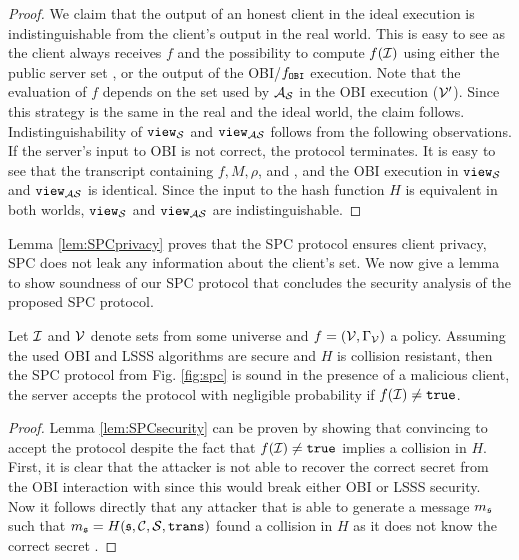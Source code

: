 \begin{proof}
We claim that the output of an honest client in the ideal execution is indistinguishable from the client's output in the real world.
This is easy to see as the client always receives $f$ and the possibility to compute $f(\mathcal{I})$ using either the public server set \ServerSet, or the output of the \ac{OBI}/$f_\mathtt{OBI}$ execution.
Note that the evaluation of $f$ depends on the set used by $\mathcal{A}_\mathcal{S}$ in the \ac{OBI} execution ($\mathcal{V}'$).
Since this strategy is the same in the real and the ideal world, the claim follows.
Indistinguishability of $\mathtt{view}_\mathcal{S}$ and $\mathtt{view}_{\mathcal{A}\mathcal{S}}$ follows from the following observations.
If the server's input to \ac{OBI} is not correct, the protocol terminates.
It is easy to see that the transcript containing $f, M, \rho$, and \ServerSet, and the \ac{OBI} execution in $\mathtt{view}_\mathcal{S}$ and $\mathtt{view}_{\mathcal{A}\mathcal{S}}$ is identical.
Since the input to the hash function $H$ is equivalent in both worlds, $\mathtt{view}_\mathcal{S}$ and $\mathtt{view}_{\mathcal{A}\mathcal{S}}$ are indistinguishable.

\end{proof}

\noindent
Lemma \ref{lem:SPCprivacy} proves that the \ac{SPC} protocol ensures client privacy, \ie \ac{SPC} does not leak any information about the client's set.
We now give a lemma to show soundness of our \ac{SPC} protocol that concludes the security analysis of the proposed \ac{SPC} protocol.

\begin{lemma}[Soundness]\label{lem:SPCsecurity}
  Let $\mathcal{I}$ and $\mathcal{V}$ denote sets from some universe and $f=(\mathcal{V},\Gamma_\mathcal{V})$ a policy.
  Assuming the used \ac{OBI} and \ac{LSSS} algorithms are secure and $H$ is collision resistant, then the \ac{SPC} protocol from Fig. \ref{fig:spc} is sound in the presence of a malicious client, \ie the server accepts the protocol with negligible probability if $f(\mathcal{I})\not=\mathtt{true}$.
\end{lemma}

\begin{proof}
Lemma \ref{lem:SPCsecurity} can be proven by showing that convincing \Server to accept the protocol despite the fact that $f(\mathcal{I})\not=\mathtt{true}$ implies a collision in $H$.
First, it is clear that the attacker is not able to recover the correct secret \secret from the \ac{OBI} interaction with \Server since this would break either \ac{OBI} or \ac{LSSS} security.
Now it follows directly that any attacker that is able to generate a message $m_\mathfrak{s}$ such that $m_\mathfrak{s}=H(\mathfrak{s},\mathcal{C},\mathcal{S},\mathtt{trans})$ found a collision in $H$ as it does not know the correct secret \secret.
\end{proof}


